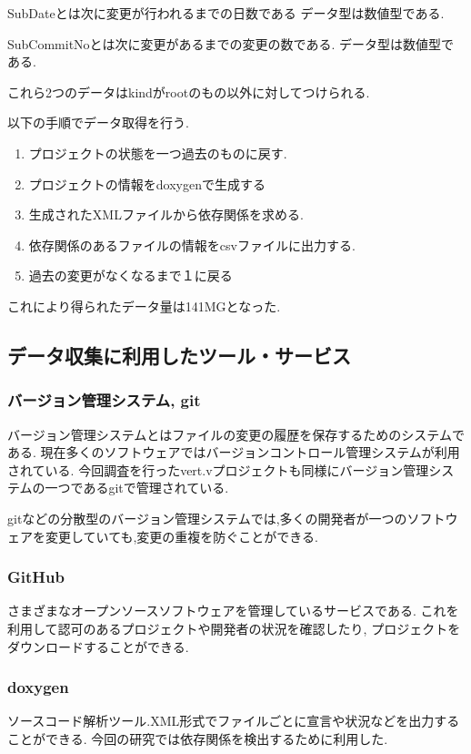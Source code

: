 \documentclass[submit,ses,noauthor]{ipsj} %
\begin{document}
SubDateとは次に変更が行われるまでの日数である
データ型は数値型である.

SubCommitNoとは次に変更があるまでの変更の数である.
データ型は数値型である.

これら2つのデータはkindがrootのもの以外に対してつけられる.

以下の手順でデータ取得を行う.
\begin{enumerate}
\item プロジェクトの状態を一つ過去のものに戻す.
\item プロジェクトの情報をdoxygenで生成する
\item 生成されたXMLファイルから依存関係を求める.
\item 依存関係のあるファイルの情報をcsvファイルに出力する.
\item 過去の変更がなくなるまで１に戻る
\end{enumerate}
これにより得られたデータ量は141MGとなった.


\subsection{データ収集に利用したツール・サービス}
\subsubsection{バージョン管理システム, git}
バージョン管理システムとはファイルの変更の履歴を保存するためのシステムである.
現在多くのソフトウェアではバージョンコントロール管理システムが利用されている.
今回調査を行ったvert.vプロジェクトも同様にバージョン管理システムの一つであるgitで管理されている.

gitなどの分散型のバージョン管理システムでは,多くの開発者が一つのソフトウェアを変更していても,変更の重複を防ぐことができる.

\subsubsection{GitHub}
さまざまなオープンソースソフトウェアを管理しているサービスである.
これを利用して認可のあるプロジェクトや開発者の状況を確認したり, プロジェクトをダウンロードすることができる.

\subsubsection{doxygen}
ソースコード解析ツール.XML形式でファイルごとに宣言や状況などを出力することができる.
今回の研究では依存関係を検出するために利用した.
\end{document}

